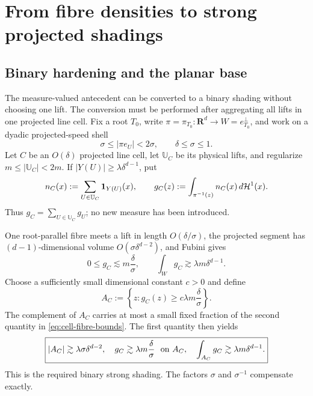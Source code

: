 \documentclass[11pt]{article}
\newcommand{\R}{\mathbf R}
\begin{document}
\section{From fibre densities to strong projected shadings}

\subsection{Binary hardening and the planar base}

The measure-valued antecedent can be converted to a binary shading without
choosing one lift.  The conversion must be performed after aggregating all
lifts in one projected line cell.  Fix a root \(T_0\), write
\(\pi=\pi_{T_0}:\R^d\to W=e_{T_0}^{\perp}\), and work on a dyadic projected-speed
shell
\begin{equation}\label{eq:projected-speed-shell}
 \sigma\le |\pi e_U|<2\sigma,
 \qquad \delta\le\sigma\le1.
\end{equation}
Let \(C\) be an \(O(\delta)\) projected line cell, let
\(\mathbb U_C\) be its physical lifts, and regularize
\(m\le|\mathbb U_C|<2m\).  If
\(|Y(U)|\ge\lambda\delta^{d-1}\), put
\begin{equation}\label{eq:cell-fibre-density}
 n_C(x):=\sum_{U\in\mathbb U_C}{\bf1}_{Y(U)}(x),
 \qquad
 g_C(z):=\int_{\pi^{-1}(z)}n_C(x)\,d\mathcal H^1(x).
\end{equation}
Thus \(g_C=\sum_{U\in\mathbb U_C}g_U\); no new measure has been introduced.

One root-parallel fibre meets a lift in length \(O(\delta/\sigma)\), the
projected segment has \((d-1)\)-dimensional volume
\(O(\sigma\delta^{d-2})\), and Fubini gives
\begin{equation}\label{eq:cell-fibre-bounds}
 0\le g_C\lesssim m\frac\delta\sigma,
 \qquad
 \int_Wg_C\gtrsim\lambda m\delta^{d-1}.
\end{equation}
Choose a sufficiently small dimensional constant \(c>0\) and define
\begin{equation}\label{eq:binary-strong-shading}
 A_C:=\left\{z:
 g_C(z)\ge c\lambda m\frac\delta\sigma\right\}.
\end{equation}
The complement of \(A_C\) carries at most a small fixed fraction of the second
quantity in \eqref{eq:cell-fibre-bounds}.  The first quantity then yields
\begin{equation}\label{eq:strong-shading-bounds}
 \boxed{
 |A_C|\gtrsim\lambda\sigma\delta^{d-2},
 \quad
 g_C\gtrsim\lambda m\frac\delta\sigma\ \hbox{ on }A_C,
 \quad
 \int_{A_C}g_C\gtrsim\lambda m\delta^{d-1}.}
\end{equation}
This is the required binary strong shading.  The factors \(\sigma\) and
\(\sigma^{-1}\) compensate exactly.
\end{document}
